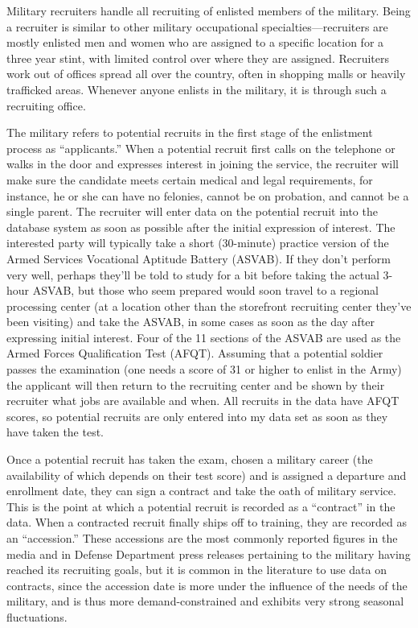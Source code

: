 \documentclass[12pt] {article}
\begin{document}
Military recruiters handle all recruiting of enlisted members of the military. Being a recruiter is similar to other military occupational
specialties---recruiters are mostly enlisted men and women who are
assigned to a specific location for a three year stint, with limited
control over where they are assigned. Recruiters work out of offices
spread all over the country, often in shopping malls or heavily trafficked
areas. Whenever anyone enlists in the military, it is through such
a recruiting office.

The military refers to potential recruits in the first stage of the enlistment process as {}``applicants.'' When a potential recruit first calls on
the telephone or walks in the door and expresses interest in joining
the service, the recruiter will make sure the candidate meets certain
medical and legal requirements, for instance, he or she can have no
felonies, cannot be on probation, and cannot be a single parent. The
recruiter will enter data on the potential recruit into the database
system as soon as possible after the initial expression of interest.
The interested party will typically take a short (30-minute) practice
version of the Armed Services Vocational Aptitude Battery (ASVAB).
If they don't perform very well, perhaps they'll be told to study
for a bit before taking the actual 3-hour ASVAB, but those who seem
prepared would soon travel to a regional processing center (at a location
other than the storefront recruiting center they've been visiting)
and take the ASVAB, in some cases as soon as the day after expressing
initial interest. Four of the 11 sections of the ASVAB are used as
the Armed Forces Qualification Test (AFQT). Assuming that a potential soldier passes the examination
(one needs a score of 31 or higher to enlist in the Army) the applicant will
then return to the recruiting center and be shown by their recruiter
what jobs are available and when. All recruits in the data have AFQT scores, so potential recruits are only entered into my data set as soon as they have taken the test.

Once a potential recruit has taken the exam, chosen a military career
(the availability of which depends on their test score) and is assigned
a departure and enrollment date, they can sign a contract and take
the oath of military service. This is the point at which a potential
recruit is recorded as a ``contract'' in the data. When a contracted
recruit finally ships off to training, they are recorded as an {}``accession.''
These accessions are the most commonly reported figures in the media
and in Defense Department press releases pertaining to the military
having reached its recruiting goals, but it is common in the literature
to use data on contracts, since the accession date is more under the
influence of the needs of the military, and is thus more demand-constrained
and exhibits very strong seasonal fluctuations.
\end{document}
